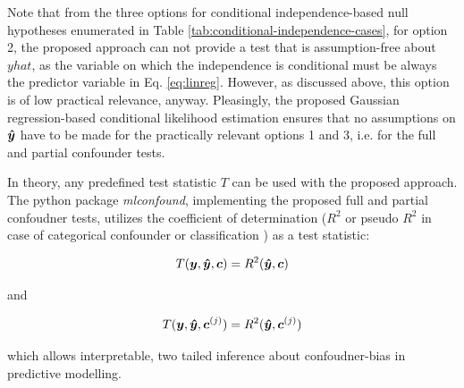 \documentclass{article}
\begin{document}
Note that from the three options for conditional independence-based null hypotheses enumerated in Table \ref{tab:conditional-independence-cases}, for option 2, the proposed approach can not provide a test that is assumption-free about $yhat$, as the variable on which the independence is conditional must be always the predictor variable in Eq. \ref{eq:linreg}. However, as discussed above, this option is of low practical relevance, anyway.
Pleasingly,  the proposed Gaussian regression-based conditional likelihood estimation ensures that no assumptions on $\boldsymbol{\hat{y}}$ have to be made for the practically relevant options 1 and 3, i.e. for the full and partial confounder tests.

In theory, any predefined test statistic $T$ can be used with the proposed approach. The python package \emph{mlconfound}, implementing the proposed full and partial confoudner tests, utilizes the coefficient of determination ($R^2$ or pseudo $R^2$ in case of categorical confounder or classification \citep{starkweather2011multinomial}) as a test statistic:

$$T(\boldsymbol{y}, \boldsymbol{\hat{y}}, \boldsymbol{c}) = R^2(\boldsymbol{\hat{y}}, \boldsymbol{c})$$ 

and

$$T(\boldsymbol{y}, \boldsymbol{\hat{y}}, \boldsymbol{c}^{(j)}) = R^2(\boldsymbol{\hat{y}}, \boldsymbol{c}^{(j)})$$ 

which allows interpretable, two tailed inference about confoudner-bias in predictive modelling.
\end{document}

